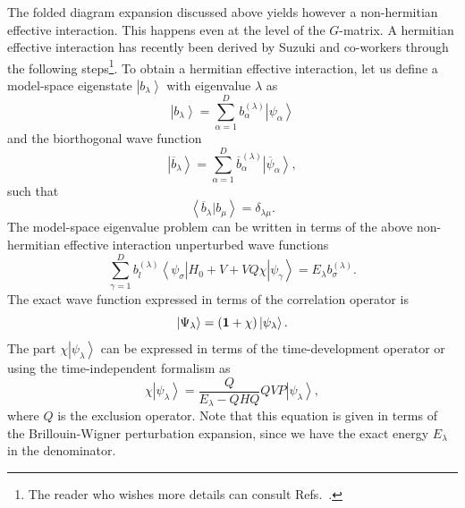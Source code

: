 \documentclass{article}
\begin{document}
The folded diagram expansion discussed above yields however
a non-hermitian effective interaction. This happens even at the
level of the $G$-matrix.
A hermitian effective interaction has recently been derived by
Suzuki and co-workers \cite{so95,so84,kehlsok93} through the
following steps\footnote{The reader who wishes more details can consult
Refs.\ \cite{so95,kehlsok93}.}.
To obtain a hermitian effective interaction,
let us define
a model-space eigenstate
$\left | b_{\lambda}\right\rangle$ with eigenvalue $\lambda$ as
\begin{equation}
     \left | b_{\lambda}\right\rangle=\sum_{\alpha =1}^{D}
     b_{\alpha}^{(\lambda )}\left | \psi_{\alpha}\right\rangle
\end{equation}
and the biorthogonal wave function
\begin{equation}
     \left | \overline{b}_{\lambda}\right\rangle=\sum_{\alpha=1}^{D}
      \overline{b}_{\alpha}^{(\lambda )}
     \left | \overline{\psi}_{\alpha}\right\rangle,
\end{equation}
such that
\begin{equation}
     {\left\langle \overline{b}_{\lambda} | b_{\mu} \right\rangle}=
     \delta_{\lambda\mu}.
\end{equation}
The model-space eigenvalue problem can be written
in terms of the above non-hermitian effective interaction unperturbed
wave functions
\begin{equation}
     {\displaystyle
     \sum_{\gamma =1}^{D}b_l^{(\lambda )}\left\langle \psi_{\sigma}\right |
     H_0+V+VQ\chi\left | \psi_{\gamma}\right\rangle}  =
     E_{\lambda}b_{\sigma}^{(\lambda )}.
\end{equation}
The exact wave function expressed in terms of the correlation
operator is
\begin{equation}
      \left | \Psi_{\lambda}\right\rangle=
      ({\bf 1}+\chi)\left | \psi_{\lambda}\right\rangle.
\end{equation}
The part $\chi\left | \psi_{\lambda}\right\rangle$ can be expressed in terms
of the time-development operator or
using the time-independent formalism as
\begin{equation}
  \chi\left | \psi_{\lambda}\right\rangle=
  \frac{Q}{E_{\lambda}-QHQ}QVP\left | \psi_{\lambda}\right\rangle,
  \label{eq:newchi}
\end{equation}
where $Q$ is the exclusion operator. Note that this equation is given
in terms of the Brillouin-Wigner perturbation expansion, since
we have the exact energy $E_{\lambda}$ in the denominator.
\end{document}
